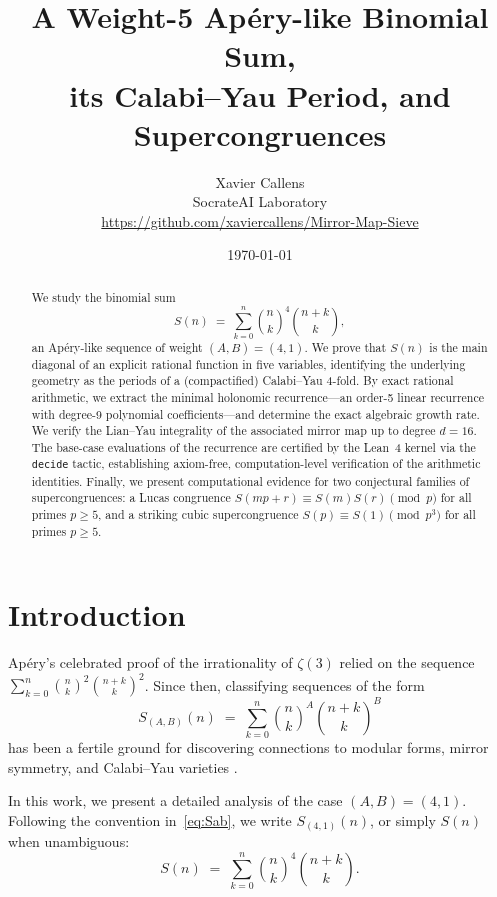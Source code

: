 \documentclass[11pt, a4paper]{article}
\title{A Weight-5 Ap\'ery-like Binomial Sum, \\ its Calabi--Yau Period, and Supercongruences}
\author{Xavier Callens \\ SocrateAI Laboratory \\ \url{https://github.com/xaviercallens/Mirror-Map-Sieve}}
\date{\today}
\begin{document}
\maketitle

\begin{abstract}
We study the binomial sum
\[
  S(n) \;=\; \sum_{k=0}^n \binom{n}{k}^4 \binom{n+k}{k},
\]
an Ap\'ery-like sequence of weight $(A,B)=(4,1)$. We prove that $S(n)$ is the main diagonal of an explicit rational function in five variables, identifying the underlying geometry as the periods of a (compactified) Calabi--Yau 4-fold. By exact rational arithmetic, we extract the minimal holonomic recurrence---an order-5 linear recurrence with degree-9 polynomial coefficients---and determine the exact algebraic growth rate. We verify the Lian--Yau integrality of the associated mirror map up to degree $d=16$. The base-case evaluations of the recurrence are certified by the Lean~4 kernel via the \texttt{decide} tactic, establishing axiom-free, computation-level verification of the arithmetic identities. Finally, we present computational evidence for two conjectural families of supercongruences: a Lucas congruence $S(mp+r) \equiv S(m) S(r) \pmod{p}$ for all primes $p \ge 5$, and a striking cubic supercongruence $S(p) \equiv S(1) \pmod{p^3}$ for all primes $p \ge 5$.
\end{abstract}

\section{Introduction}

Ap\'ery's celebrated proof of the irrationality of $\zeta(3)$ \cite{vanderPoorten1979} relied on the sequence $\sum_{k=0}^n \binom{n}{k}^2 \binom{n+k}{k}^2$. Since then, classifying sequences of the form
\begin{equation}\label{eq:Sab}
  S_{(A,B)}(n) \;=\; \sum_{k=0}^n \binom{n}{k}^A \binom{n+k}{k}^B
\end{equation}
has been a fertile ground for discovering connections to modular forms, mirror symmetry, and Calabi--Yau varieties \cite{Almkvist2005, Zagier2009, Straub2014}.

In this work, we present a detailed analysis of the case $(A,B)=(4,1)$. Following the convention in~\eqref{eq:Sab}, we write $S_{(4,1)}(n)$, or simply $S(n)$ when unambiguous:
\begin{equation}\label{eq:S20def}
  S(n) \;=\; \sum_{k=0}^n \binom{n}{k}^4 \binom{n+k}{k}.
\end{equation}
\end{document}
